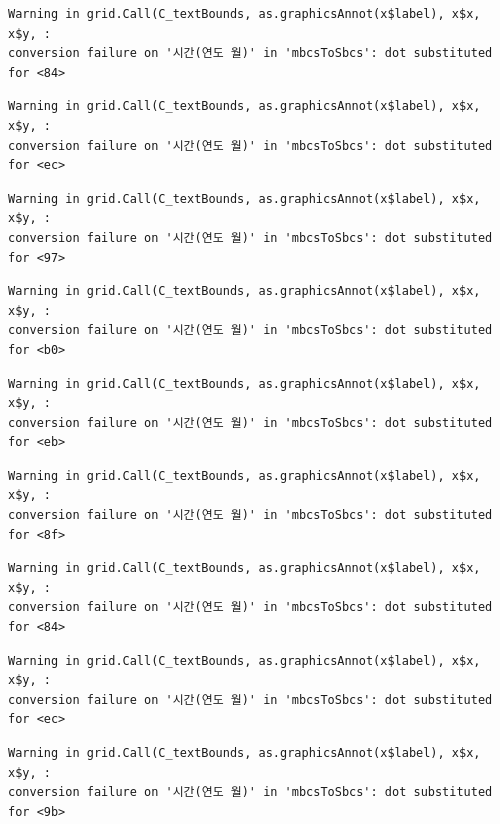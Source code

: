 \documentclass[
  letterpaper,
  DIV=11,
  numbers=noendperiod]{scrreprt}
\begin{document}
\begin{verbatim}
Warning in grid.Call(C_textBounds, as.graphicsAnnot(x$label), x$x, x$y, :
conversion failure on '시간(연도 월)' in 'mbcsToSbcs': dot substituted for <84>
\end{verbatim}

\begin{verbatim}
Warning in grid.Call(C_textBounds, as.graphicsAnnot(x$label), x$x, x$y, :
conversion failure on '시간(연도 월)' in 'mbcsToSbcs': dot substituted for <ec>
\end{verbatim}

\begin{verbatim}
Warning in grid.Call(C_textBounds, as.graphicsAnnot(x$label), x$x, x$y, :
conversion failure on '시간(연도 월)' in 'mbcsToSbcs': dot substituted for <97>
\end{verbatim}

\begin{verbatim}
Warning in grid.Call(C_textBounds, as.graphicsAnnot(x$label), x$x, x$y, :
conversion failure on '시간(연도 월)' in 'mbcsToSbcs': dot substituted for <b0>
\end{verbatim}

\begin{verbatim}
Warning in grid.Call(C_textBounds, as.graphicsAnnot(x$label), x$x, x$y, :
conversion failure on '시간(연도 월)' in 'mbcsToSbcs': dot substituted for <eb>
\end{verbatim}

\begin{verbatim}
Warning in grid.Call(C_textBounds, as.graphicsAnnot(x$label), x$x, x$y, :
conversion failure on '시간(연도 월)' in 'mbcsToSbcs': dot substituted for <8f>
\end{verbatim}

\begin{verbatim}
Warning in grid.Call(C_textBounds, as.graphicsAnnot(x$label), x$x, x$y, :
conversion failure on '시간(연도 월)' in 'mbcsToSbcs': dot substituted for <84>
\end{verbatim}

\begin{verbatim}
Warning in grid.Call(C_textBounds, as.graphicsAnnot(x$label), x$x, x$y, :
conversion failure on '시간(연도 월)' in 'mbcsToSbcs': dot substituted for <ec>
\end{verbatim}

\begin{verbatim}
Warning in grid.Call(C_textBounds, as.graphicsAnnot(x$label), x$x, x$y, :
conversion failure on '시간(연도 월)' in 'mbcsToSbcs': dot substituted for <9b>
\end{verbatim}
\end{document}
